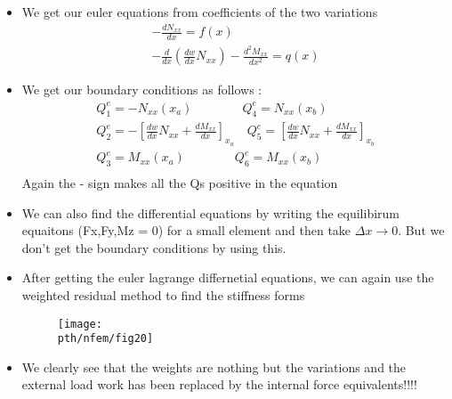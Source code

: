 	\begin{frame}
		\begin{itemize}
			\item We get our euler equations from coefficients of the two variations
			\begin{equation}
			\begin{aligned}
				-\frac{dN_{xx}}{dx} = f(x) \\
				-\frac{d}{dx}\left(\frac{dw}{dx}N_{xx} \right) - \frac{d^2 M_{xx}}{dx^2} = q(x)
			\end{aligned}
			\end{equation}
			\item We get our boundary conditions as follows :
			\begin{equation}
			\begin{aligned}
			  Q_1^e = -N_{xx}(x_a) \qquad \qquad Q_4^e = N_{xx}(x_b) \\
			  Q_2^e = -\left[ \frac{dw}{dx}N_{xx} + \frac{dM_{xx}}{dx}\right]_{x_a} \quad 
			  Q_5^e = \left[ \frac{dw}{dx}N_{xx} + \frac{dM_{xx}}{dx}\right]_{x_b} \\
			  Q_3^e = M_{xx}(x_a) \qquad\qquad  Q_6^e = M_{xx}(x_b) \\
			\end{aligned}
			\end{equation}
			Again the - sign makes all the Qs positive in the equation
		\end{itemize}
	\end{frame}


	\begin{frame}
		\begin{itemize}
			\item We can also find the differential equations by writing the equilibirum equaitons (Fx,Fy,Mz = 0) for a small element and then take $\Delta x \rightarrow 0$. But we don't get the boundary conditions by using this. 
			\item After getting the euler lagrange differnetial equations, we can again use the weighted residual method to find the stiffness forms
			\begin{figure}
				\centering
				\texttt{[image: \\pth/nfem/fig20]} 		
			\end{figure}
			\item We clearly see that the weights are nothing but the variations and the external load work has been replaced by the internal force equivalents!!!!
		\end{itemize}
	\end{frame}



